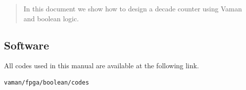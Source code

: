 \documentclass[journal,12pt,twocolumn]{IEEEtran}
\begin{document}



%
\fi
\begin{abstract}
In this document we show how to design a decade counter using Vaman and
boolean logic.


\end{abstract}

%
\subsection{Software}
All codes used in this manual are available at the following link.
\begin{lstlisting}
vaman/fpga/boolean/codes
\end{lstlisting}
%
\end{document}
